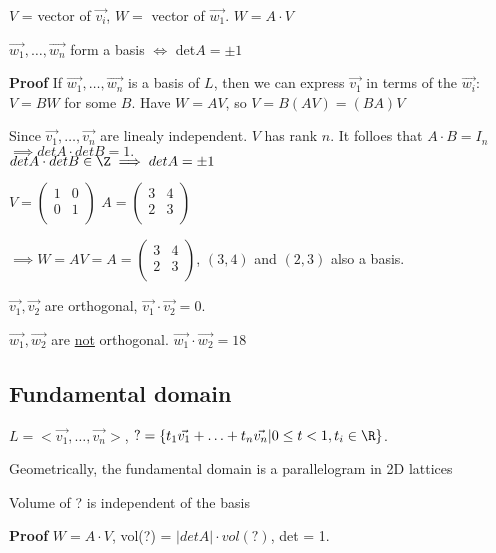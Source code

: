 \documentclass[10pt]{article}
\begin{document}
$V$ = vector of $\vec{v_i}$, $W = $ vector of $\vec{w_1}$. $W = A\cdot V$

\begin{lem}
    $\vec{w_1}, \ldots, \vec{w_n}$ form a basis $\iff$ det$A = \pm 1$
\end{lem}
\textbf{Proof} If $\vec{w_1}, \ldots, \vec{w_n}$ is a basis of $L$, then we can express $\vec{v_1}$ in terms of the $\vec{w_i}$: $V = BW$ for some $B$. Have $W = AV$, so $V = B(AV) = (BA)V$

Since $\vec{v_1}, \ldots, \vec{v_n}$ are linealy independent. $V$ has rank $n$. It folloes that $A \cdot B = I_n$\\
$\implies det A \cdot det B = 1.$\\
$det A \cdot det B \in \Z \implies det A = \pm 1$

\begin{exm}
    $V = \begin{pmatrix}
        1 & 0\\
        0 & 1\\
    \end{pmatrix}$ $A = \begin{pmatrix}
        3 & 4\\
        2 & 3\\
    \end{pmatrix}$
\end{exm}
$\implies W = AV = A = \begin{pmatrix}
    3 & 4\\
    2 & 3\\
\end{pmatrix}$, $(3, 4)$ and $(2, 3)$ also a basis. 

$\vec{v_1}, \vec{v_2}$ are orthogonal, $\vec{v_1} \cdot \vec{v_2} = 0$.

$\vec{w_1}, \vec{w_2}$ are \underline{not} orthogonal. $\vec{w_1} \cdot \vec{w_2} = 18$

\subsection{Fundamental domain}
\begin{defn}
    $L = <\vec{v_1}, \ldots, \vec{v_n}>$, $? = \{t_1\vec{v_1} + \ldots + t_n \vec{v_n} | 0 \leq t < 1, t_i \in \R\}$. 
\end{defn}
Geometrically, the fundamental domain is a parallelogram in 2D lattices

\begin{rmk}
    Volume of ? is independent of the basis
\end{rmk}
\textbf{Proof} $W = A\cdot V$, vol(?) = $|detA| \cdot vol(?)$, det = 1.
\end{document}
